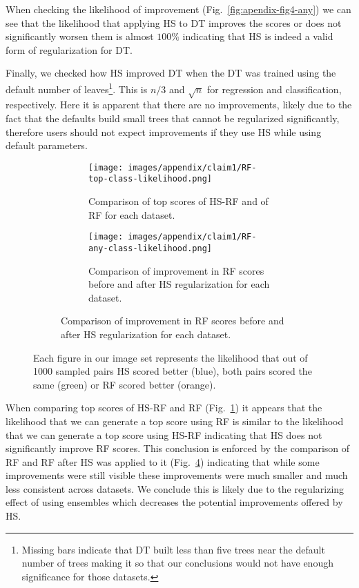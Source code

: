 When checking the likelihood of improvement (Fig.~\ref{fig:apendix-fig4-any}) we can see that the likelihood that applying HS to DT improves the scores or does not significantly worsen them is almost $100\%$ indicating that HS is indeed a valid form of regularization for DT.

Finally, we checked how HS improved DT when the DT was trained using the default number of leaves\footnote{Missing bars indicate that DT built less than five trees near the default number of trees making it so that our conclusions would not have enough significance for those datasets.}. This is $n/3$ and $\sqrt{n}$ for regression and classification, respectively.
Here it is apparent that there are no improvements, likely due to the fact that the defaults build small trees that cannot be regularized significantly, therefore users should not expect improvements if they use HS while using default parameters.

\begin{figure}[hbt]
    \begin{subfigure}[b]{\textwidth}
        \begin{subfigure}[b]{0.48\textwidth}
            \centering
            \texttt{[image: images/appendix/claim1/RF-top-class-likelihood.png]}
            \caption{Comparison of top scores of HS-RF and of RF for each dataset. \label{fig:apendix-fig4-rf-top}}
        \end{subfigure}
        \begin{subfigure}[b]{0.48\textwidth}
            \centering
            \texttt{[image: images/appendix/claim1/RF-any-class-likelihood.png]}
            \caption{Comparison of improvement in RF scores before and after HS regularization for each dataset. \label{fig:apendix-fig4-rf-imp}}
        \end{subfigure}
    \end{subfigure}
    \caption{Each figure in our image set represents the likelihood that out of 1000 sampled pairs HS scored better (blue), both pairs scored the same (green) or RF scored better (orange).}
\end{figure}

When comparing top scores of HS-RF and RF (Fig.~\ref{fig:apendix-fig4-rf-top}) it appears that the likelihood that we can generate a top score using RF is similar to the likelihood that we can generate a top score using HS-RF indicating that HS does not significantly improve RF scores. This conclusion is enforced by the comparison of RF and RF after HS was applied to it (Fig.~\ref{fig:apendix-fig4-rf-imp}) indicating that while some improvements were still visible these improvements were much smaller and much less consistent across datasets.
We conclude this is likely due to the regularizing effect of using ensembles which decreases the potential improvements offered by HS.

